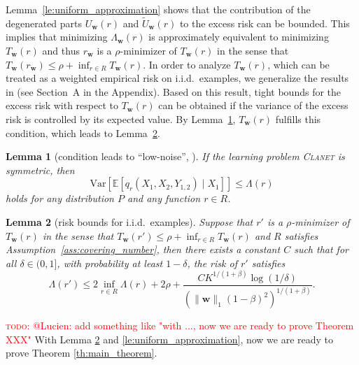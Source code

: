 \documentclass[letterpaper]{article} %
\newtheorem{lemma}{Lemma}
\newcommand{\E}{\mathbb{E}}
\newcommand{\Var}{\text{Var}}
\newcommand{\weight}{\mathbf{w}}
\newcommand{\distribution}{P}
\newcommand{\problemabbr}{\textnormal{C}\textsc{lanet}}
\newcommand{\normo}[1]{\|#1\|_1}
\newcommand{\complexbound}{\beta}
\newcommand{\red}[1]{\textcolor{red}{#1}}
\newcommand{\todo}[1]{\red{\textsc{todo:} #1}}
\begin{document}
Lemma~\ref{le:uniform_approximation} shows that the contribution of the degenerated parts $U_\weight{}(r)$ and $\widetilde{U}_\weight{}(r)$ to the excess risk can be bounded. 
This implies that minimizing $\Lambda_\weight{}(r)$ is approximately equivalent to minimizing $T_\weight{}(r)$ and thus $r_\weight{}$ is a $\rho$-minimizer of $T_\weight{}(r)$ in the sense that $T_\weight{}(r_\weight{})\le \rho+\inf_{r\in R}T_\weight{}(r)$.
In order to analyze $T_\weight{}(r)$, which can be treated as a weighted empirical risk on i.i.d.\ examples, we generalize the results in \cite{Massart2006} (see Section~A in the Appendix). 
Based on this result, tight bounds for the excess risk with respect to $T_\weight{}(r)$
can be obtained if the variance of the excess risk is controlled by its expected value.
By Lemma~\ref{le:variant_control}, $T_\weight{}(r)$ fulfills this condition, which leads to Lemma~\ref{le:risk_bounds_iid}.

\begin{lemma}[condition leads to ``low-noise'', {\cite[Lemma 2]{papa2016graph}}]
    \label{le:variant_control}
    If the learning problem \problemabbr{} is symmetric, then
    \begin{equation}
        \label{eq:variant_control}
        \Var\left[\E[q_r(X_1,X_2,Y_{1,2})\mid X_1]\right]\le \Lambda(r) 
    \end{equation}
    holds for any distribution $\distribution$ and any function $r\in R$.
\end{lemma}

\begin{lemma}[risk bounds for i.i.d.\ examples]
\label{le:risk_bounds_iid}
  Suppose that $r'$ is a $\rho$-minimizer of $T_\weight{}(r)$ in the sense that $T_\weight{}(r')\le \rho + \inf_{r\in R}T_\weight{}(r)$ and $R$ satisfies Assumption~\ref{ass:covering_number}, then there exists a constant $C$ such that for all $\delta\in(0,1]$, with probability at least $1-\delta$, the risk of $r'$ satisfies
  \[\Lambda(r')\le 2\inf_{r\in R}\Lambda(r)+2\rho+\frac{CK^{1/(1+\complexbound{})}\log(1/\delta)}{(\normo{\weight{}}(1-\complexbound{})^2)^{1/(1+\complexbound{})}}.\]
\end{lemma}


\todo{@Lucien: add something like "with ..., now we are ready to prove Theorem XXX"}
With Lemma \ref{le:risk_bounds_iid} and \ref{le:uniform_approximation}, now we are ready to prove Theorem \ref{th:main_theorem}.
\end{document}
